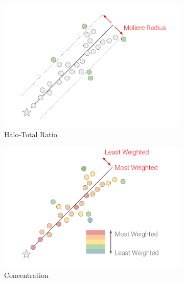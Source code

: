 \begin{figure}[b!]
        \centering
        \begin{subfigure}[b]{0.495\textwidth}
            \centering
            \includegraphics[width=\textwidth]{HaloTotalRatio}
            \caption{Halo-Total Ratio}%
            \label{fig:halototalratio}
        \end{subfigure}
        \hfill
        \begin{subfigure}[b]{0.495\textwidth}  
            \centering 
            \includegraphics[width=\textwidth]{Concentration}
            \caption{Concentration}%
            \label{fig:concentration}
        \end{subfigure}
        \hfill
        \begin{subfigure}[b]{0.495\textwidth}  
            \centering 

\end{subfigure}
\end{figure}
